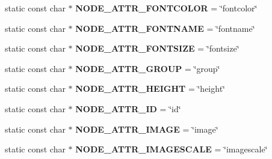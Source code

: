 \begin{DoxyCompactItemize}
\item 
static const char $\ast$ {\bfseries N\+O\+D\+E\+\_\+\+A\+T\+T\+R\+\_\+\+F\+O\+N\+T\+C\+O\+L\+OR} = \char`\"{}fontcolor\char`\"{}\hypertarget{classmemgraph_1_1_graphviz_attrs_ac3bae9f82580c94c6bd12361810860d6}{}\label{classmemgraph_1_1_graphviz_attrs_ac3bae9f82580c94c6bd12361810860d6}

\item 
static const char $\ast$ {\bfseries N\+O\+D\+E\+\_\+\+A\+T\+T\+R\+\_\+\+F\+O\+N\+T\+N\+A\+ME} = \char`\"{}fontname\char`\"{}\hypertarget{classmemgraph_1_1_graphviz_attrs_ac7d2aeedd5af25fbabb14aa8ca7dec0b}{}\label{classmemgraph_1_1_graphviz_attrs_ac7d2aeedd5af25fbabb14aa8ca7dec0b}

\item 
static const char $\ast$ {\bfseries N\+O\+D\+E\+\_\+\+A\+T\+T\+R\+\_\+\+F\+O\+N\+T\+S\+I\+ZE} = \char`\"{}fontsize\char`\"{}\hypertarget{classmemgraph_1_1_graphviz_attrs_ae17ab6ea97d0c7b89d76ad14d79df90b}{}\label{classmemgraph_1_1_graphviz_attrs_ae17ab6ea97d0c7b89d76ad14d79df90b}

\item 
static const char $\ast$ {\bfseries N\+O\+D\+E\+\_\+\+A\+T\+T\+R\+\_\+\+G\+R\+O\+UP} = \char`\"{}group\char`\"{}\hypertarget{classmemgraph_1_1_graphviz_attrs_a4be8f3335721e71d104e9498aad96ea7}{}\label{classmemgraph_1_1_graphviz_attrs_a4be8f3335721e71d104e9498aad96ea7}

\item 
static const char $\ast$ {\bfseries N\+O\+D\+E\+\_\+\+A\+T\+T\+R\+\_\+\+H\+E\+I\+G\+HT} = \char`\"{}height\char`\"{}\hypertarget{classmemgraph_1_1_graphviz_attrs_a15fbe3d67b6310230f6ecdbc8d52fd10}{}\label{classmemgraph_1_1_graphviz_attrs_a15fbe3d67b6310230f6ecdbc8d52fd10}

\item 
static const char $\ast$ {\bfseries N\+O\+D\+E\+\_\+\+A\+T\+T\+R\+\_\+\+ID} = \char`\"{}id\char`\"{}\hypertarget{classmemgraph_1_1_graphviz_attrs_ac1748f8c0dfa7576970371090652a771}{}\label{classmemgraph_1_1_graphviz_attrs_ac1748f8c0dfa7576970371090652a771}

\item 
static const char $\ast$ {\bfseries N\+O\+D\+E\+\_\+\+A\+T\+T\+R\+\_\+\+I\+M\+A\+GE} = \char`\"{}image\char`\"{}\hypertarget{classmemgraph_1_1_graphviz_attrs_a21da3b30748bf57113af28dd8c4144cf}{}\label{classmemgraph_1_1_graphviz_attrs_a21da3b30748bf57113af28dd8c4144cf}

\item 
static const char $\ast$ {\bfseries N\+O\+D\+E\+\_\+\+A\+T\+T\+R\+\_\+\+I\+M\+A\+G\+E\+S\+C\+A\+LE} = \char`\"{}imagescale\char`\"{}\hypertarget{classmemgraph_1_1_graphviz_attrs_a696321b40a6eb35e68cf28b141d6f3ee}{}\label{classmemgraph_1_1_graphviz_attrs_a696321b40a6eb35e68cf28b141d6f3ee}


\end{DoxyCompactItemize}
